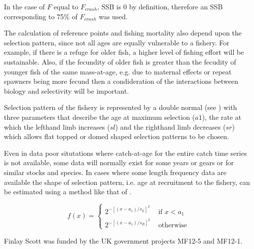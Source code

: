 \documentclass{pnastwo}
\begin{document}
\begin{article}
\begin{materials}
In the case of $F$ equal to $F_{crash}$, SSB is 0 by definition, therefore an SSB corresponding 
to 75\% of $F_{crash}$ was used.

The calculation of reference points and fishing mortality also depend upon the selection pattern,
since not all ages are equally vulnerable to a fishery. For example, if there is a refuge for older fish,
a higher level of fishing effort will be sustainable. Also, if the fecundity of older fish is greater 
than the fecudity of younger fish of the same mass-at-age, e.g. due to maternal effects or repeat 
spawners being more fecund then a condideration of the interactions between biology and selectivity 
will be important.

Selection pattern of the fishery is represented by a double normal
(see \cite{Hilbornetal2000}) with three parameters that describe the age at 
maximum selection ($a1$), the rate at which the lefthand 
limb increases ($sl$) and the righthand limb decreases ($sr$) which 
allows flat topped or domed shaped selection patterns to be chosen.

Even in data poor situtations where catch-at-age for the entire catch time series 
is not available, some data will normally exist for some years or gears or for 
similar stocks and species. In cases where some length frequency data are available 
the shape of selection pattern, i.e. age at recruitment to the fishery, 
can be estimated using a method like that of \cite{wetherall1987estimating}.

\begin{equation}
f(x) = \left\{ \begin{array}{rl}
 2^{-[(x-a_1)/s_L]^2} &\mbox{ if $x<a_1$} \\
 2^{-[(x-a_1)/s_R]^2} &\mbox{ otherwise}
       \end{array} \right.
\end{equation}
 

\end{materials}



\begin{acknowledgments}
Finlay Scott was funded by the UK government projects MF12-5 and MF12-1.
\end{acknowledgments}



\end{article}
\end{document}
